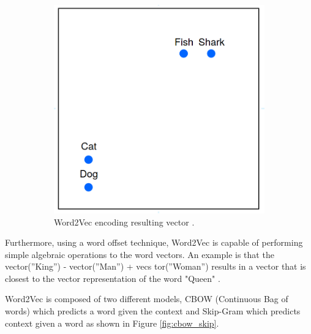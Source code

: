\begin{figure}[H]
\begin{subfigure}{0.32\textwidth}
            \end{subfigure}
            \begin{subfigure}{0.32\textwidth}
            \includegraphics[width=\textwidth]{Sections/3StateOfTheArt/3_images/word2vec_encode.png}\hfill
            \caption{Word2Vec encoding resulting vector \cite{word2vec_explained}. }
            \end{subfigure}
            \caption{}
            \label{fig:one_vs_word2vec}

          \end{figure}

          Furthermore, using a word offset technique, Word2Vec is capable of performing simple algebraic operations to the word vectors. An example is that the vector(”King”) - vector(”Man”) + vecs
          tor(”Woman”) results in a vector that is closest to the vector representation of the word "Queen" \cite{Mikolov2013}. 

        
        Word2Vec is composed of two different models, CBOW (Continuous Bag of words) which predicts a word given the context and Skip-Gram which predicts context given a word \cite{Mikolov2013} \cite{Wiki} as shown in Figure \ref{fig:cbow_skip}.

        

